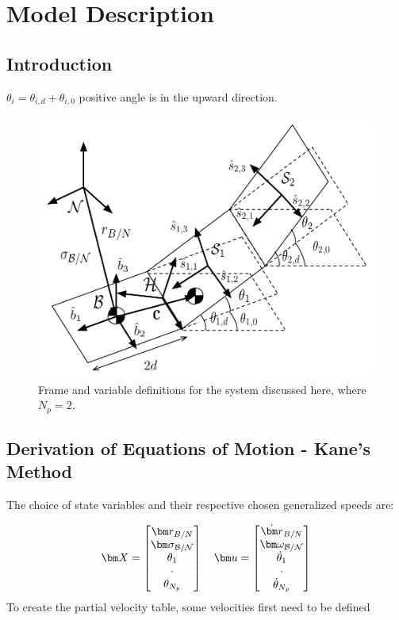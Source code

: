 \newcommand{\specialcell}[2][c]{%
	\begin{tabular}[#1]{@{}c@{}}#2\end{tabular}}

\section{Model Description}

\subsection{Introduction}
$\theta_i = \theta_{i,d} + \theta_{i,0}$ positive angle is in the upward direction.
\begin{figure}[H]
	\centerline{
	\includegraphics[scale=0.5]{Figures/conn_panels5.pdf}}
	\caption{Frame and variable definitions for the system discussed here, where $N_p=2$.}
	\label{fig:flexNPanel}
\end{figure}
\subsection{Derivation of Equations of Motion - Kane's Method}

The choice of state variables and their respective chosen generalized speeds are:

\begin{equation}
	\bm X = 
	\begin{bmatrix}
		\bm r_{B/N}\\
		\bm \sigma_{\cal{B/N}}\\
		\theta_1\\
		\cdot\\
		\theta_{N_p}
	\end{bmatrix}
	\quad
	\bm u = \begin{bmatrix}
		\dot{\bm r}_{B/N}\\
		\bm \omega_{\cal{B/N}}\\
		\dot{\theta}_1\\
		\cdot\\
		\dot{\theta}_{N_p}
	\end{bmatrix}
\end{equation} 	
To create the partial velocity table, some velocities first need to be defined

